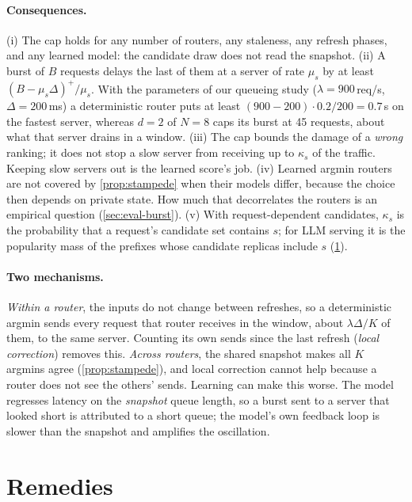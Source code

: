 \documentclass[10pt,twocolumn,letterpaper]{article}
\begin{document}
\paragraph{Consequences.} (i) The cap holds for any number of routers, any
staleness, any refresh phases, and any learned model: the candidate draw does
not read the snapshot. (ii) A burst of $B$ requests delays the last of them at a
server of rate $\mu_s$ by at least $(B-\mu_s\Delta)^+/\mu_s$. With the
parameters of our queueing study ($\lambda=900$\,req/s, $\Delta=200$\,ms) a
deterministic router puts at least $(900-200)\cdot0.2/200=0.7$\,s on the fastest
server, whereas $d=2$ of $N=8$ caps its burst at 45 requests, about what that
server drains in a window. (iii) The cap bounds the damage of a \emph{wrong}
ranking; it does not stop a slow server from receiving up to $\kappa_s$ of the
traffic. Keeping slow servers out is the learned score's job.
(iv) Learned argmin routers are not covered by \cref{prop:stampede} when their
models differ, because the choice then depends on private state. How much that
decorrelates the routers is an empirical question (\cref{sec:eval-burst}).
(v) With request-dependent candidates, $\kappa_s$ is the probability that a
request's candidate set contains $s$; for LLM serving it is the popularity mass of
the prefixes whose candidate replicas include $s$ (\cref{sec:design}).

\paragraph{Two mechanisms.} \emph{Within a router}, the inputs do not change
between refreshes, so a deterministic argmin sends every request that router
receives in the window, about $\lambda\Delta/K$ of them, to the same server.
Counting its own sends since the last refresh (\emph{local correction})
removes this. \emph{Across routers}, the shared snapshot makes all $K$ argmins
agree (\cref{prop:stampede}), and local correction cannot help because a router
does not see the others' sends. Learning can make this worse. The model
regresses latency on the \emph{snapshot} queue length, so a burst sent to a
server that looked short is attributed to a short queue; the model's own
feedback loop is slower than the snapshot and amplifies the oscillation.

\section{Remedies}
\label{sec:design}
\end{document}

